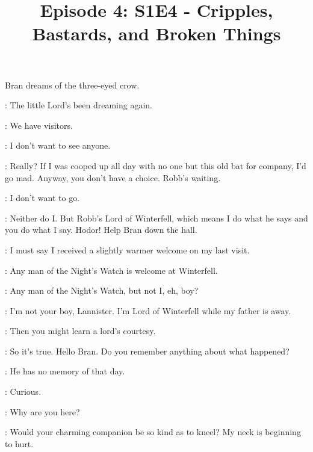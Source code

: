 

\title{Episode 4: S1E4 - Cripples, Bastards, and Broken Things}
\author{}
\date{}
\maketitle



\scene

\n Bran dreams of the three-eyed crow.

\scene



\OLDNAN: The little Lord's been dreaming again. 

\THEON: We have visitors. 

\BRAN: I don't want to see anyone. 

\THEON: Really? If I was cooped up all day with no one but this old bat for company, I'd go mad. Anyway, you don't have a choice. Robb's waiting. 

\BRAN: I don't want to go. 

\THEON: Neither do I. But Robb's Lord of Winterfell, which means I do what he says and you do what I say. Hodor! Help Bran down the hall. 

\scene



\TYRION: I must say I received a slightly warmer welcome on my last visit. 

\ROBB: Any man of the Night's Watch is welcome at Winterfell. 

\TYRION: Any man of the Night's Watch, but not I, eh, boy? 

\ROBB: I'm not your boy, Lannister. I'm Lord of Winterfell while my father is away. 

\TYRION: Then you might learn a lord's courtesy. 


\TYRION: So it's true. Hello Bran. Do you remember anything about what happened? 

\LUWIN: He has no memory of that day. 

\TYRION: Curious. 

\ROBB: Why are you here? 

\TYRION:  Would your charming companion be so kind as to kneel? My neck is beginning to hurt. 

